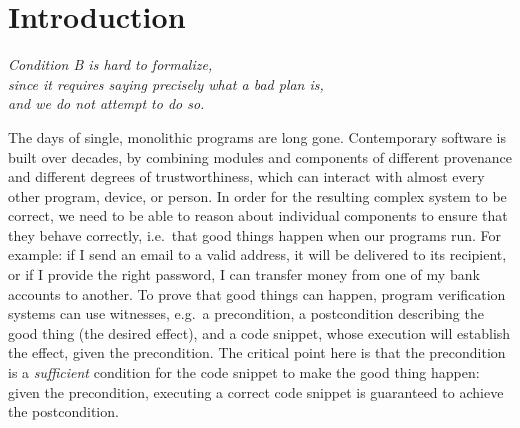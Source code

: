 \renewcommand{\sophia}[2][]{\ponders{Sophia}{blue}{#1} \textcolor{blue}{#2}\xspace}


\section{Introduction}


\begin{flushright}
  \textit{Condition B is hard to formalize, \\since it requires saying precisely what a bad
plan is,\\ and we do not attempt to do so.}\\
 \cite{byzantine}
\end{flushright}

The days of single, monolithic programs are long gone.  Contemporary
software is built over decades, by combining modules and components of
different provenance and different degrees of trustworthiness, which can
interact with almost every other program, device, or person.
In order for the resulting complex system to be correct, we need to be
able to reason about individual components to ensure that they behave
correctly, i.e.\ that good things happen when our programs run.
For example: if I send an email to a valid address, it will be
delivered to its recipient, or if I provide the right password, I can
transfer money from one of my bank accounts to another. 
To prove that good things can
happen, program verification systems can use witnesses, e.g.\ a
precondition, a postcondition describing the good thing (the desired
effect), and a code snippet, whose execution will establish the
effect, given the precondition.  The critical point here is that the
precondition is a \emph{sufficient} condition for the code snippet to
make the good thing happen: given the precondition, executing a
correct code snippet is guaranteed to achieve the postcondition.

